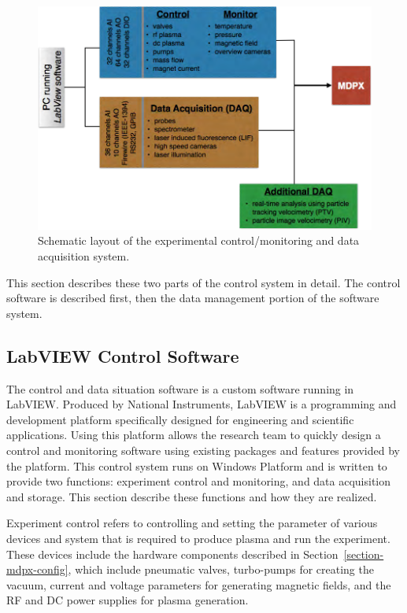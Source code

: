 \begin{figure}[h!]
\begin{center}
\includegraphics[width=6in]{figures/mdpx_software_structure.png}
\caption{Schematic layout of the experimental control/monitoring and data acquisition system. \label{mdpx-software-structure}}
\end{center}
\end{figure}

This section describes these two parts of the control system in detail. The control software is described first, then the data management portion of the software system.


\subsection{LabVIEW Control Software}
The control and data situation software is a custom software running in LabVIEW\cite{website:labview}. Produced by National Instruments, LabVIEW is a programming and development platform specifically designed for engineering and scientific applications. Using this platform allows the research team to quickly design a control and monitoring software using existing packages and features provided by the platform. This control system runs on Windows Platform and is written to provide two functions: experiment control and monitoring, and data acquisition and storage. This section describe these functions and how they are realized.

Experiment control refers to controlling and setting the parameter of various devices and system that is required to produce plasma and run the experiment. These devices include the hardware components described in Section~\ref{section-mdpx-config}, which include pneumatic valves, turbo-pumps for creating the vacuum, current and voltage parameters for generating magnetic fields, and the RF and DC power supplies for plasma generation.

